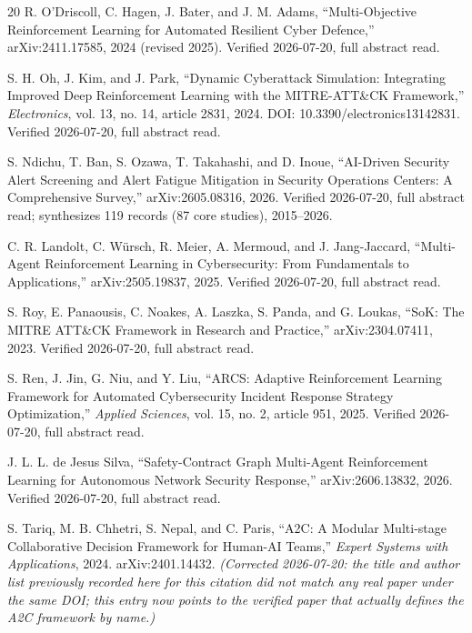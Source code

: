 \documentclass[conference]{IEEEtran}
\begin{document}
\begin{thebibliography}{20}
R. O'Driscoll, C. Hagen, J. Bater, and J. M. Adams, ``Multi-Objective Reinforcement Learning for Automated Resilient Cyber Defence,'' arXiv:2411.17585, 2024 (revised 2025). Verified 2026-07-20, full abstract read.

S. H. Oh, J. Kim, and J. Park, ``Dynamic Cyberattack Simulation: Integrating Improved Deep Reinforcement Learning with the MITRE-ATT\&CK Framework,'' \emph{Electronics}, vol. 13, no. 14, article 2831, 2024. DOI: 10.3390/electronics13142831. Verified 2026-07-20, full abstract read.

S. Ndichu, T. Ban, S. Ozawa, T. Takahashi, and D. Inoue, ``AI-Driven Security Alert Screening and Alert Fatigue Mitigation in Security Operations Centers: A Comprehensive Survey,'' arXiv:2605.08316, 2026. Verified 2026-07-20, full abstract read; synthesizes 119 records (87 core studies), 2015--2026.

C. R. Landolt, C. W\"ursch, R. Meier, A. Mermoud, and J. Jang-Jaccard, ``Multi-Agent Reinforcement Learning in Cybersecurity: From Fundamentals to Applications,'' arXiv:2505.19837, 2025. Verified 2026-07-20, full abstract read.

S. Roy, E. Panaousis, C. Noakes, A. Laszka, S. Panda, and G. Loukas, ``SoK: The MITRE ATT\&CK Framework in Research and Practice,'' arXiv:2304.07411, 2023. Verified 2026-07-20, full abstract read.

S. Ren, J. Jin, G. Niu, and Y. Liu, ``ARCS: Adaptive Reinforcement Learning Framework for Automated Cybersecurity Incident Response Strategy Optimization,'' \emph{Applied Sciences}, vol. 15, no. 2, article 951, 2025. Verified 2026-07-20, full abstract read.

J. L. L. de Jesus Silva, ``Safety-Contract Graph Multi-Agent Reinforcement Learning for Autonomous Network Security Response,'' arXiv:2606.13832, 2026. Verified 2026-07-20, full abstract read.

S. Tariq, M. B. Chhetri, S. Nepal, and C. Paris, ``A2C: A Modular Multi-stage Collaborative Decision Framework for Human-AI Teams,'' \emph{Expert Systems with Applications}, 2024. arXiv:2401.14432. \emph{(Corrected 2026-07-20: the title and author list previously recorded here for this citation did not match any real paper under the same DOI; this entry now points to the verified paper that actually defines the A2C framework by name.)}


\end{thebibliography}
\end{document}
